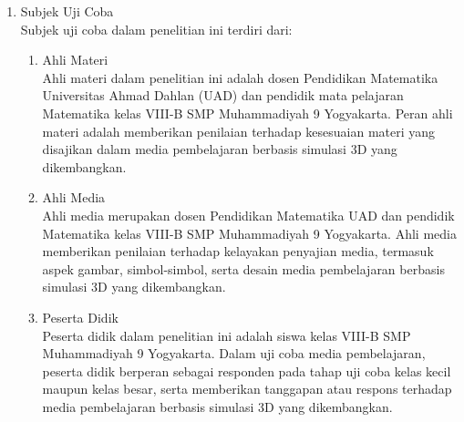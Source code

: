 \begin{enumerate}
    \item Subjek Uji Coba\\
    \hspace*{1cm}Subjek uji coba dalam penelitian ini terdiri dari:
    \begin{enumerate}
        \item Ahli Materi\\
        Ahli materi dalam penelitian ini adalah dosen Pendidikan Matematika Universitas Ahmad Dahlan (UAD) dan pendidik mata pelajaran Matematika kelas VIII-B SMP Muhammadiyah 9 Yogyakarta. Peran ahli materi adalah memberikan penilaian terhadap kesesuaian materi yang disajikan dalam media pembelajaran berbasis simulasi 3D yang dikembangkan.

        \item Ahli Media\\
        Ahli media merupakan dosen Pendidikan Matematika UAD dan pendidik Matematika kelas VIII-B SMP Muhammadiyah 9 Yogyakarta. Ahli media memberikan penilaian terhadap kelayakan penyajian media, termasuk aspek gambar, simbol-simbol, serta desain media pembelajaran berbasis simulasi 3D yang dikembangkan.

        \item Peserta Didik\\
        Peserta didik dalam penelitian ini adalah siswa kelas VIII-B SMP Muhammadiyah 9 Yogyakarta. Dalam uji coba media pembelajaran, peserta didik berperan sebagai responden pada tahap uji coba kelas kecil maupun kelas besar, serta memberikan tanggapan atau respons terhadap media pembelajaran berbasis simulasi 3D yang dikembangkan.
    \end{enumerate}


\end{enumerate}

